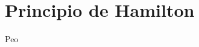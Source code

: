 \documentclass[../main.tex]{subfiles}
\begin{document}
\section{Principio de Hamilton}
Peo
\end{document}
